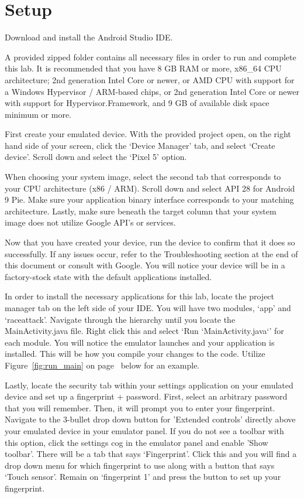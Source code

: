 \documentclass[letterpaper,12pt]{report}
\begin{document}

\section*{Setup}\label{sec:Setup}

Download and install the Android Studio IDE.

A provided zipped folder contains all necessary files in order to run and complete this lab. It is recommended that you have 8 GB RAM or more, x86\_64 CPU architecture; 2nd generation Intel Core or newer, or AMD CPU with support for a Windows Hypervisor / ARM-based chips, or 2nd generation Intel Core or newer with support for Hypervisor.Framework, and 9 GB of available disk space minimum or more.

\bigskip

First create your emulated device. With the provided project open, on the right hand side of your screen, click the ‘Device Manager’ tab, and select ‘Create device’. Scroll down and select the ‘Pixel 5’ option.

When choosing your system image, select the second tab that corresponds to your CPU architecture (x86 / ARM). Scroll down and select API 28 for Android 9 Pie. Make sure your application binary interface corresponds to your matching architecture. Lastly, make sure beneath the target column that your system image does not utilize Google API’s or services.

Now that you have created your device, run the device to confirm that it does so successfully. If any issues occur, refer to the Troubleshooting section at the end of this document or consult with Google. You will notice your device will be in a factory-stock state with the default applications installed.

In order to install the necessary applications for this lab, locate the project manager tab on the left side of your IDE. You will have two modules, ‘app’ and ‘raceattack’. Navigate through the hierarchy until you locate the MainActivity.java file. Right click this and select ‘Run `MainActivity.java`’ for each module. You will notice the emulator launches and your application is installed. This will be how you compile your changes to the code. Utilize Figure~\ref{fig:run_main} on page~\pageref{fig:run_main} below for an example.

Lastly, locate the security tab within your settings application on your emulated device and set up a fingerprint + password. First, select an arbitrary password that you will remember. Then, it will prompt you to enter your fingerprint. Navigate to the 3-bullet drop down button for 'Extended controls' directly above your emulated device in your emulator panel. If you do not see a toolbar with this option, click the settings cog in the emulator panel and enable 'Show toolbar'. There will be a tab that says ‘Fingerprint’. Click this and you will find a drop down menu for which fingerprint to use along with a button that says ‘Touch sensor’. Remain on ‘fingerprint 1’ and press the button to set up your fingerprint.
\end{document}
